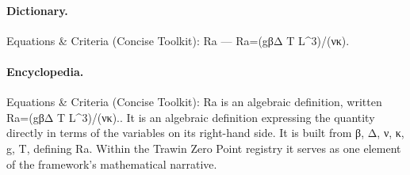 \paragraph{Dictionary.}
Equations \& Criteria (Concise Toolkit): Ra — Ra=(gβΔ T L\textasciicircum{}3)/(νκ).

\paragraph{Encyclopedia.}
Equations \& Criteria (Concise Toolkit): Ra is an algebraic definition, written Ra=(gβΔ T L\textasciicircum{}3)/(νκ).. It is an algebraic definition expressing the quantity directly in terms of the variables on its right-hand side. It is built from β, Δ, ν, κ, g, T, defining Ra. Within the Trawin Zero Point registry it serves as one element of the framework's mathematical narrative.

